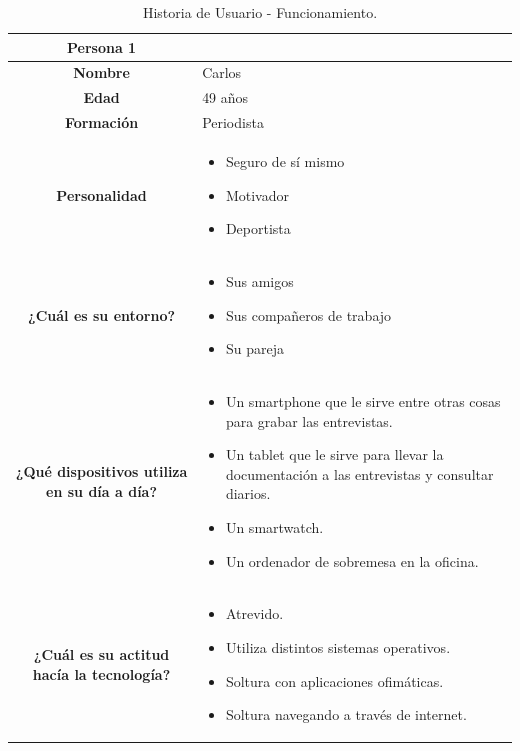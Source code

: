 \begin{table}[H]
	\begin{center}
		\begin{tabular}{| c | p{9cm} |}
			\hline
			Persona 1 &  \\ \hline
\hline
			\textbf{Nombre} & Carlos \\
			\textbf{Edad} & 49 años \\
			\textbf{Formación} & Periodista \\
			\textbf{Personalidad} &
			\begin{itemize}
                \item Seguro de sí mismo
                \item Motivador
                \item Deportista
            \end{itemize}
			\\
			\textbf{¿Cuál es su entorno?} &
			\begin{itemize}
                \item Sus amigos
                \item Sus compañeros de trabajo
                \item Su pareja
            \end{itemize}
			\\
			\textbf{¿Qué dispositivos utiliza en su día a día?} &
			\begin{itemize}
                \item Un smartphone que le sirve entre otras cosas para grabar las entrevistas.
                \item Un tablet que le sirve para llevar la documentación a las entrevistas y consultar diarios.
                \item Un smartwatch.
                \item Un ordenador de sobremesa en la oficina.
            \end{itemize}
			\\

			\textbf{¿Cuál es su actitud hacía la tecnología?} &
			\begin{itemize}
                \item Atrevido.
                \item Utiliza distintos sistemas operativos.
                \item Soltura con aplicaciones ofimáticas.
                \item Soltura navegando a través de internet.
            \end{itemize}
			\\

			\hline
		\end{tabular}
		\caption{Historia de Usuario - Funcionamiento.}
	\end{center}
\end{table}


